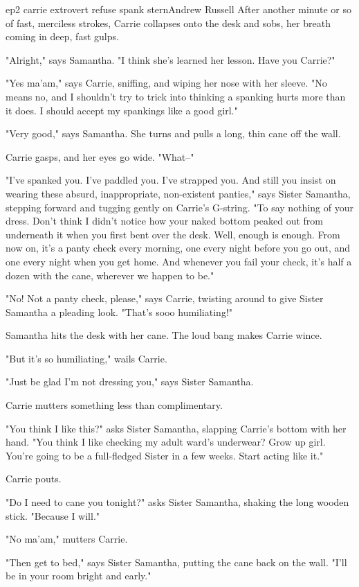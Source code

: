 \documentclass{book}
\begin{document}
\begin{childnode}{ep2 carrie extrovert refuse spank stern}{Andrew Russell}
    After another minute or so of fast, merciless strokes, Carrie collapses onto the desk and sobs, her breath coming in deep, fast gulps.

    "Alright," says Samantha. "I think she's learned her lesson. Have you Carrie?"

    "Yes ma'am," says Carrie, sniffing, and wiping her nose with her sleeve. "No means no, and I shouldn't try to trick \nickname{} into thinking a spanking hurts more than it does. I should accept my spankings like a good girl."

    "Very good," says Samantha. She turns and pulls a long, thin cane off the wall.

    Carrie gasps, and her eyes go wide. "What--"

    "I've spanked you. I've paddled you. I've strapped you. And still you insist on wearing these absurd, inappropriate, non-existent panties," says Sister Samantha, stepping forward and tugging gently on Carrie's G-string. "To say nothing of your dress. Don't think
    I didn't notice how your naked bottom peaked out from underneath it when you first bent over the desk. Well, enough is enough. From now on, it's a panty check every morning, one every night before you go out, and one every night when you get home. And whenever
    you fail your check, it's half a dozen with the cane, wherever we happen to be."

    "No! Not a panty check, please," says Carrie, twisting around to give Sister Samantha a pleading look. "That's sooo humiliating!"

    Samantha hits the desk with her cane. The loud bang makes Carrie wince.

    "But it's so humiliating," wails Carrie.

    "Just be glad I'm not dressing you," says Sister Samantha. 

    Carrie mutters something less than complimentary.

    "You think I like this?" asks Sister Samantha, slapping Carrie's bottom with her hand. "You think I like checking my adult ward's underwear? Grow up girl. You're going to be a full-fledged Sister in a few weeks. Start acting like it."

    Carrie pouts.

    "Do I need to cane you tonight?" asks Sister Samantha, shaking the long wooden stick. "Because I will."

    "No ma'am," mutters Carrie.

    "Then get to bed," says Sister Samantha, putting the cane back on the wall. "I'll be in your room bright and early." 


\end{childnode}
\end{document}
